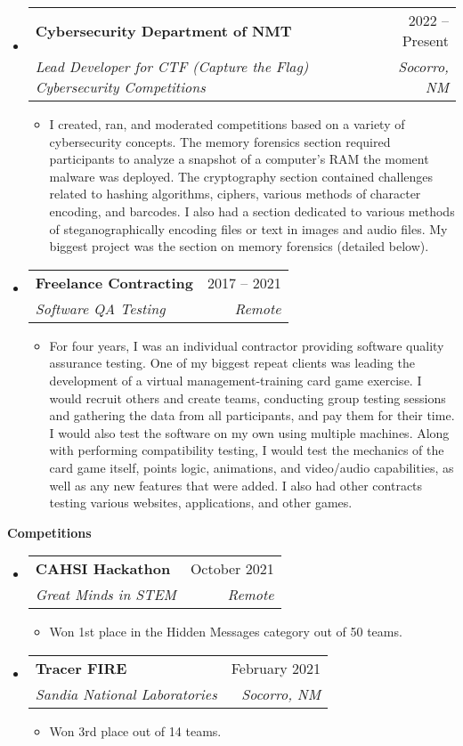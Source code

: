 \documentclass[letterpaper,12pt]{article}[leftmargin=*]
\makeatletter
\def \entryspacing {-0pt}
\renewcommand{\section}[2]{\vspace{5pt}
  \colorbox{secondary}{\color{white}\raggedbottom\normalsize\textbf{{#1}{\hspace{7pt}#2}}}
}
\newcommand{\resumeEntryStart}{\begin{itemize}[leftmargin=2.5mm]}
\newcommand{\resumeEntryEnd}{\end{itemize}\vspace{\entryspacing}}
\newcommand{\resumeItemListStart}{\begin{itemize}[leftmargin=4.5mm]}
\newcommand{\resumeItemListEnd}{\end{itemize}}
\newcommand{\resumeItem}[1]{
  \item\small{
    {#1 \vspace{-2pt}}
  }
}
\newcommand{\resumeEntryTSDL}[4]{
  \vspace{-1pt}\item[]
    \begin{tabularx}{0.97\textwidth}{X@{\hspace{60pt}}r}
      \textbf{\color{primary}#1} & {\firabook\color{accent}\small#2} \\
      \textit{\color{accent}\small#3} & \textit{\color{accent}\small#4} \\
    \end{tabularx}\vspace{-6pt}
}
\makeatother
\begin{document}
  \resumeEntryStart
    \resumeEntryTSDL
      {Cybersecurity Department of NMT}{2022 -- Present}
      {Lead Developer for CTF (Capture the Flag) Cybersecurity Competitions}{Socorro, NM}
    \resumeItemListStart
      \resumeItem {I created, ran, and moderated competitions based on a variety of cybersecurity concepts. The memory forensics section required participants to analyze a snapshot of a computer's RAM the moment malware was deployed.  The cryptography section contained challenges related to hashing algorithms, ciphers, various methods of character encoding, and barcodes. I also had a section dedicated to various methods of steganographically encoding files or text in images and audio files. My biggest project was the section on memory forensics (detailed below).}
    \resumeItemListEnd
  \resumeEntryEnd

    \resumeEntryStart
    \resumeEntryTSDL
      {Freelance Contracting}{2017 -- 2021}
      {Software QA Testing}{Remote}
    \resumeItemListStart
      \resumeItem {For four years, I was an individual contractor providing software quality assurance testing. One of my biggest repeat clients was leading the development of a virtual management-training card game exercise. I would recruit others and create teams, conducting group testing sessions and gathering the data from all participants, and pay them for their time. I would also test the software on my own using multiple machines. Along with performing compatibility testing, I would test the mechanics of the card game itself, points logic, animations, and video/audio capabilities, as well as any new features that were added. I also had other contracts testing various websites, applications, and other games.}
    \resumeItemListEnd
  \resumeEntryEnd


\section{\faFlask}{Competitions}

  \resumeEntryStart
    \resumeEntryTSDL
      {CAHSI Hackathon}{October 2021}{Great Minds in STEM}{Remote}
    \resumeItemListStart
      \resumeItem {Won 1st place in the Hidden Messages category out of 50 teams.}
    \resumeItemListEnd
  \resumeEntryEnd

  \resumeEntryStart
    \resumeEntryTSDL
      {Tracer FIRE}{February 2021}{Sandia National Laboratories}{Socorro, NM}
    \resumeItemListStart
      \resumeItem {Won 3rd place out of 14 teams.}
    \resumeItemListEnd
  \resumeEntryEnd 
  
\end{document}
